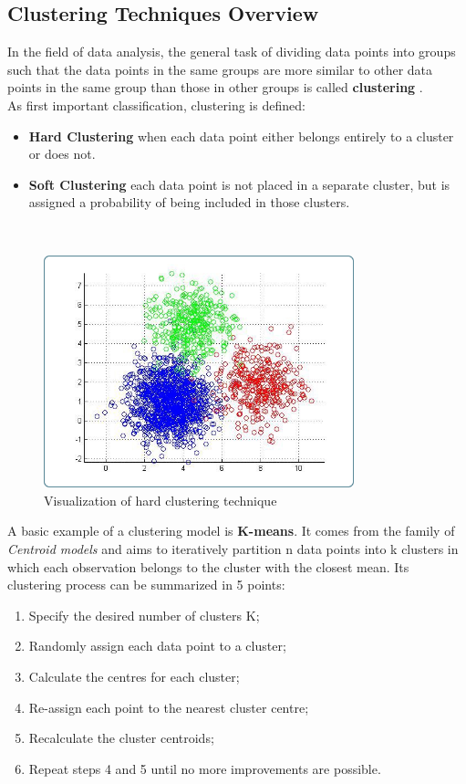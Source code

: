     \subsection{Clustering Techniques Overview}
    In the field of data analysis, the general task of dividing data points into groups such that the data points in the same groups are more similar to other data points in the same group than those in other groups is called \textbf{clustering} \cite{clustering}.
    \\
    As first important classification, clustering is defined:
    
    \begin{itemize}
    \item \textbf{Hard Clustering} when each data point either belongs entirely to a cluster or does not.
    \item \textbf{Soft Clustering} each data point is not placed in a separate cluster, but is assigned a probability of being included in those clusters.
    \end{itemize}
    \\
    
    \begin{figure}[H]
        \centering
        \includegraphics[width=9cm]{Images/1/clustering.png}
        \caption{Visualization of hard clustering technique}
    \end{figure}
        
    
    A basic example of a clustering model is \textbf{K-means}. It comes from the family of \textit{Centroid models} and aims to iteratively partition n data points into k clusters in which each observation belongs to the cluster with the closest mean.
    Its clustering process can be summarized in 5 points:
    
    \begin{enumerate}
        \item Specify the desired number of clusters K;
        \item Randomly assign each data point to a cluster;
        \item Calculate the centres for each cluster;
        \item Re-assign each point to the nearest cluster centre;
        \item Recalculate the cluster centroids;
        \item Repeat steps 4 and 5 until no more improvements are possible.
    \end{enumerate}
    
